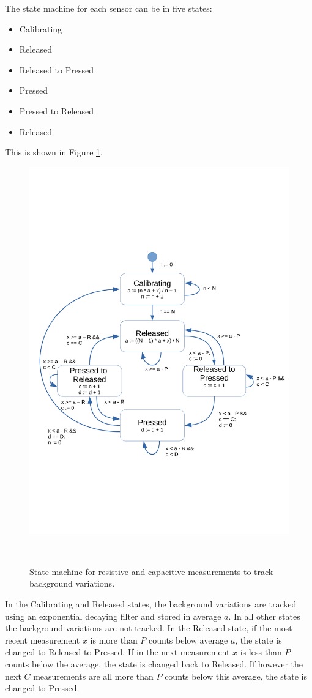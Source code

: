 \documentclass{sigchi}
\begin{document}
The state machine for each sensor can be in five states:
\begin{itemize}
\item Calibrating
\item Released
\item Released to Pressed
\item Pressed
\item Pressed to Released
\item Released
\end{itemize}
This is shown in Figure \ref{fig:state_machine}.

\begin{figure}[!htbp]
\centering
  \includegraphics[width=0.9\columnwidth]{figures/state_machine}
  \caption{State machine for resistive and capacitive measurements to track
background variations.}~\label{fig:state_machine}
\end{figure}

In the Calibrating and Released states, the background variations are tracked
using an exponential decaying filter and stored in average $a$. In all other
states the background variations are not tracked. In the Released state, if the
most recent measurement $x$ is more than $P$ counts below average $a$, the state
is changed to Released to Pressed. If in the next measurement $x$ is less
than $P$ counts below the average, the state is changed back to Released. If
however the next $C$ measurements are all more than $P$ counts below this
average, the state is changed to Pressed.
\end{document}
